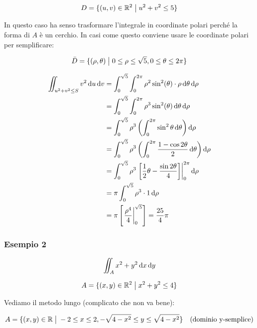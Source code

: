 \[
    D= \{(u,v) \in \mathbb{R}^2 \;\big|\; u^{2}+v^{2} \le 5\}
\]

In questo caso ha senso trasformare l'integrale in coordinate polari perché la forma di \(A\) è un cerchio. In casi come questo conviene usare le coordinate polari per semplificare:

\[
    \bar{D} = \{(\rho,\theta) \;\big|\; 0 \le \rho \le \sqrt{5}, 0 \le \theta \le 2\pi \}
\]

\begin{align*}
    \iint_{u^{2}+v^{2} \le S} {v ^{2}} \diff{u}\diff{v} & = \int_{0}^{\sqrt{5}} \int_{0}^{2\pi} \rho^{2} \sin^{2} (\theta) \cdot \rho \diff{\theta}\diff{\rho}                   \\
                                                        & = \int_{0}^{\sqrt{5}} \int_{0}^{2\pi} \rho^{3} \sin^{2} (\theta) \diff{\theta}\diff{\rho}                              \\
                                                        & = \int_{0}^{\sqrt{5}} \rho^{3} \left( \int_{0}^{2\pi} \sin ^{2} \theta \diff{\theta} \right) \diff{\rho}               \\
                                                        & = \int_{0}^{\sqrt{5}} \rho^{3} \left( \int_{0}^{2\pi} \frac{1- \cos 2 \theta}{2} \diff{\theta} \right) \diff{\rho}     \\
                                                        & = \int_{0}^{\sqrt{5}} \rho^{3} \Eval{\left[ \frac{1}{2} \theta - \frac{\sin 2 \theta}{4}\right]}{0}{2\pi}  \diff{\rho} \\
                                                        & = \pi \int_{0}^{\sqrt{5}} \rho^{3} \cdot 1 \diff{\rho}                                                                 \\
                                                        & = \pi \left[\Eval{ \frac{\rho^{4}}{4} }{0}{\sqrt{5}}\right] = \frac{25}{4}\pi
\end{align*}

\pagebreak
\subsubsection*{Esempio 2}

\[
    \iint_A {x^{2}+y^{2}} \mathop{}\!\mathrm{d}{x}\mathop{}\!\mathrm{d}{y}
\]

\[
    A = \{(x,y) \in \mathbb{R}^2 \;\big|\; x^{2} + y^{2} \le 4\}
\]

Vediamo il metodo lungo (complicato che non va bene):

\[
    A = \{(x,y) \in \mathbb{R} \;\big|\; -2 \le x \le 2, - \sqrt{4-x^{2}} \le  y \le  \sqrt{4 -x^{2}}\} \quad\text{(dominio y-semplice)}
\]

